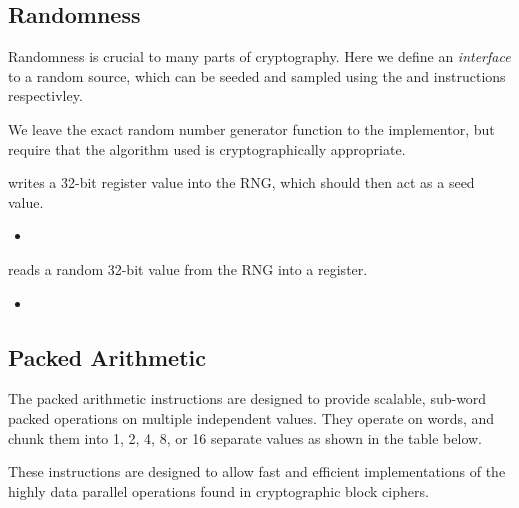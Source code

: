 \subsection{Randomness}

Randomness is crucial to many parts of cryptography. Here we define an 
{\em interface} to a random source, which can be seeded and sampled using
the  and  instructions respectivley.

We leave the exact random number generator function to the implementor,
but require that the algorithm used is cryptographically appropriate.

\ienc{\iencrseedcr}

 writes a 32-bit register value into the RNG, which should
then act as a seed value.

\begin{itemize}
\item {}
\end{itemize}

\ienc{\iencrsampcr}

 reads a random 32-bit value from the RNG into a register.

\begin{itemize}
\item {}
\end{itemize}

\subsection{Packed Arithmetic}

The packed arithmetic instructions are designed to provide scalable, sub-word
packed operations on multiple independent values. They operate on words, and
chunk them into 1, 2, 4, 8, or 16 separate values as shown in the table
below.

These instructions are designed to allow fast and efficient implementations
of the highly data parallel operations found in cryptographic block ciphers.

